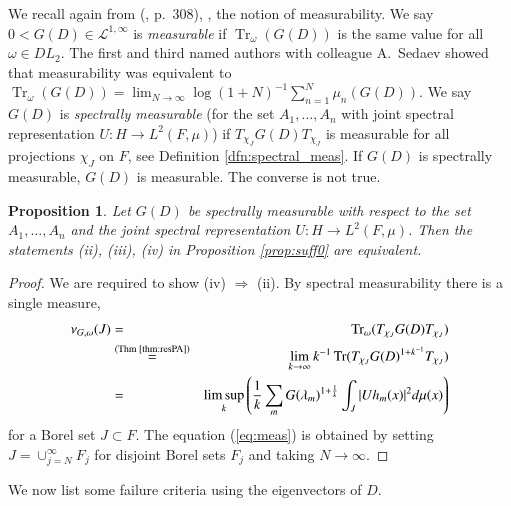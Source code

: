 \documentclass[final,1p]{elsarticle}
\numberwithin{equation}{section}
\theoremstyle{plain}
\newtheorem{prop}[thm]{Proposition}
\theoremstyle{definition}
\newcounter{prop2count}
\begin{document}
We recall again from (\cite{CN}, p.~308), \cite{LSS}, the notion of measurability.  We say
$0< G(D) \in \mathcal{L}^{1,\infty}$ is \emph{measurable} if $\operatorname{Tr}_\omega(G(D))$ is the same value for all $\omega \in DL_2$.  The first and third named authors with colleague
A.~Sedaev showed that measurability was equivalent to $\operatorname{Tr}_\omega(G(D)) = \lim_{N \to \infty} \log(1+N)^{-1} \sum_{n=1}^N \mu_n(G(D))$.
We say $G(D)$ is \emph{spectrally
measurable} (for the set $A_1,\ldots,A_n$ with joint spectral representation $U : H \to L^2(F,\mu)$) if $T_{\chi_J}G(D)T_{\chi_J}$ is measurable for all projections $\chi_J$ on $F$, see Definition \ref{dfn:spectral_meas}.  If $G(D)$ is spectrally measurable, $G(D)$ is measurable.  The converse is not true.

\begin{prop} \label{prop:suff1}
Let $G(D)$ be spectrally measurable with respect to the set $A_1,\ldots,A_n$ and the joint spectral representation $U : H \to L^2(F,\mu)$.
Then the statements (ii), (iii), (iv) in Proposition \ref{prop:suff0} are equivalent.
\end{prop}
\begin{proof}
We are required to show (iv) $\Rightarrow$ (ii).  By spectral
measurability there is a single measure,
\begin{eqnarray*}
\nu_{G,\omega}(J)
& = & \operatorname{Tr}_\omega(T_{\chi_J}G(D)T_{\chi_J}) \\
& \stackrel{\text{(Thm \ref{thm:resPA})}}{=} & \lim_{k \to \infty} k^{-1} \operatorname{Tr}(T_{\chi_J}G(D)^{1+k^{-1}}T_{\chi_J}) \\
& = & \limsup_k \left( \frac 1k \sum_m G(\lambda_m)^{1+ \frac 1k} \int_J |Uh_m(x)|^2 d\mu(x) \right)
\end{eqnarray*}
for a Borel set $J \subset F$.
The equation (\ref{eq:meas}) is obtained by setting $J = \cup^\infty_{j=N} F_j$ for disjoint Borel sets $F_j$ and taking $N \to \infty$.
\end{proof}

We now list some failure criteria
using the eigenvectors of $D$.  
\end{document}

